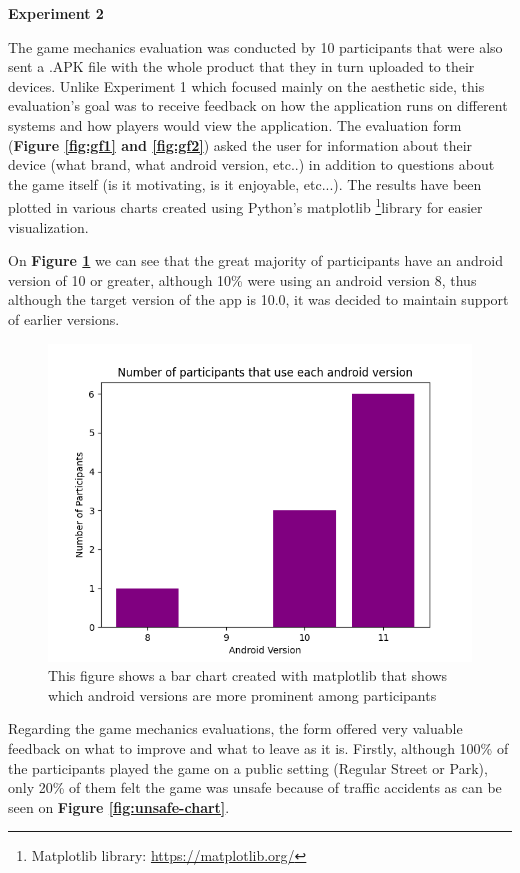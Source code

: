 \documentclass{dissertation}
\begin{document}
\textbf{Experiment 2}

The game mechanics evaluation was conducted by 10 participants that were also sent a .APK file with the whole product that they in turn uploaded to their devices. Unlike Experiment 1 which focused mainly on the aesthetic side, this evaluation's goal was to receive feedback on how the application runs on different systems and how players would view the application. The evaluation form (\textbf{Figure \ref{fig:gf1} and \ref{fig:gf2}}) asked the user for information about their device (what brand, what android version, etc..) in addition to questions about the game itself (is it motivating, is it enjoyable, etc...). The results have been plotted in various charts created using Python's matplotlib \footnote{Matplotlib library: \url{https://matplotlib.org/}}library for easier visualization. 

On \textbf{Figure \ref{fig:android-version-chart}} we can see that the great majority of participants have an android version of 10 or greater, although 10\% were using an android version 8, thus although the target version of the app is 10.0, it was decided to maintain support of earlier versions.

\begin{figure}[H]
\centering
\includegraphics[width = 12cm]{images/android-version-chart.png}
\caption{This figure shows a bar chart created with matplotlib that shows which android versions are more prominent among participants}
\label{fig:android-version-chart}
\end{figure}

Regarding the game mechanics evaluations, the form offered very valuable feedback on what to improve and what to leave as it is. Firstly, although 100\% of the participants played the game on a public setting (Regular Street or Park), only 20\% of them felt the game was unsafe because of traffic accidents as can be seen on \textbf{Figure \ref{fig:unsafe-chart}}.
\end{document}
